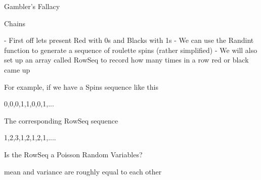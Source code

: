 
Gambler's Fallacy

Chains

 - First off lets present Red with 0s and Blacks with 1s
 - We can use the Randint function to generate a sequence of roulette spins (rather simplified)
 - We will also set up an array called RowSeq to record how many times in a row red or black came up

 For example, if we have a Spins sequence like this 
  
 0,0,0,1,1,0,0,1,...

 The corresponding RowSeq sequence

 1,2,3,1,2,1,2,1,....

Is the RowSeq a Poisson Random Variables?

mean and variance are roughly equal to each other 
